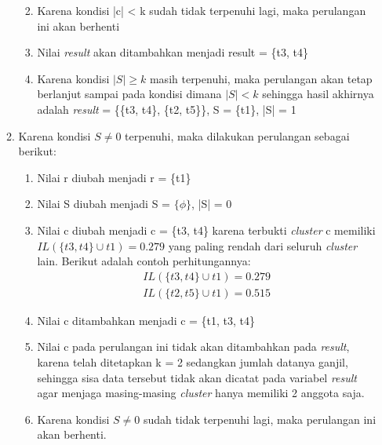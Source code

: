 \documentclass[a4paper,twoside]{article}
\begin{document}
\begin{enumerate}
\begin{enumerate}
\begin{enumerate}
\begin{enumerate}
\end{enumerate}
\item Karena kondisi |c| < k sudah tidak terpenuhi lagi, maka perulangan ini akan berhenti
\item Nilai \textit{result} akan ditambahkan menjadi result = \{t3, t4\}
\item Karena kondisi $|S| \geq k$ masih terpenuhi, maka perulangan akan tetap berlanjut sampai pada kondisi dimana $|S| < k$ sehingga hasil akhirnya adalah \textit{result} = \{\{t3, t4\}, \{t2, t5\}\}, S = \{t1\}, |S| = 1

\end{enumerate}

\item Karena kondisi $S \neq 0$ terpenuhi, maka dilakukan perulangan sebagai berikut:

\begin{enumerate}
\item Nilai r diubah menjadi r = \{t1\}
\item Nilai S diubah menjadi S = $\{\phi\}$, |S| = 0
\item Nilai c diubah menjadi c = \{t3, t4\} karena terbukti \textit{cluster} c memiliki $IL(\{t3,t4\} \cup t1)=0.279$ yang paling rendah dari seluruh \textit{cluster} lain. Berikut adalah contoh perhitungannya:
\begin{align*}
IL(\{t3,t4\} \cup t1) = 0.279 \\
IL(\{t2,t5\}\cup t1) = 0.515 
\end{align*}
\item Nilai c ditambahkan menjadi c = \{t1, t3, t4\}
\item Nilai c pada perulangan ini tidak akan ditambahkan pada \textit{result}, karena telah ditetapkan k = 2 sedangkan jumlah datanya ganjil, sehingga sisa data tersebut tidak akan dicatat pada variabel \textit{result} agar menjaga masing-masing \textit{cluster} hanya memiliki 2 anggota saja.
\item Karena kondisi $S \neq 0$ sudah tidak terpenuhi lagi, maka perulangan ini akan berhenti.

\end{enumerate}


\end{enumerate}
\end{enumerate}
\end{document}
